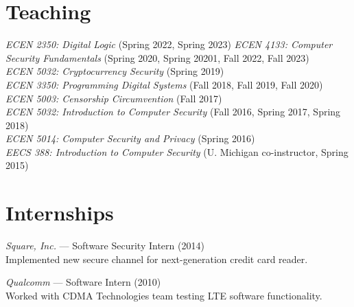 \documentclass[margin,11pt]{res} %
\begin{document}
\section{\large Teaching}
    \emph{ECEN 2350: Digital Logic} (Spring 2022, Spring 2023)
    \emph{ECEN 4133: Computer Security Fundamentals} (Spring 2020, Spring 20201, Fall 2022, Fall 2023)\\
    \emph{ECEN 5032: Cryptocurrency Security} (Spring 2019)\\
    \emph{ECEN 3350: Programming Digital Systems} (Fall 2018, Fall 2019, Fall 2020)\\
    \emph{ECEN 5003: Censorship Circumvention} (Fall 2017)\\
    \emph{ECEN 5032: Introduction to Computer Security} (Fall 2016, Spring 2017, Spring 2018)\\
    \emph{ECEN 5014: Computer Security and Privacy} (Spring 2016)\\
    \emph{EECS 388: Introduction to Computer Security}  (U. Michigan co-instructor, Spring 2015)\\


\vspace{6pt}
\section{\large Internships}

    \emph{Square, Inc.} --- Software Security Intern (2014) \\
    Implemented new secure channel for next-generation credit card reader.
    
    \emph{Qualcomm} --- Software Intern (2010) \\
    Worked with CDMA Technologies team testing LTE software functionality.
    
\end{document}
